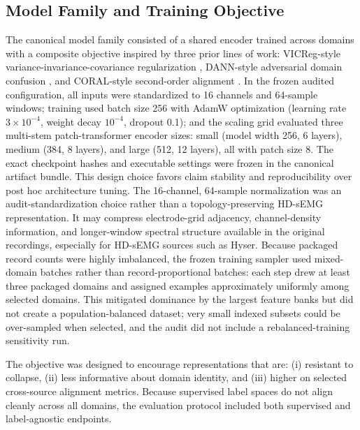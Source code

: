 \documentclass[journal]{IEEEtran}
\begin{document}
\subsection{Model Family and Training Objective}
The canonical model family consisted of a shared encoder trained across domains with a composite objective inspired by three prior lines of work: VICReg-style variance-invariance-covariance regularization \cite{bardes2022vicreg}, DANN-style adversarial domain confusion \cite{ganin2016dann}, and CORAL-style second-order alignment \cite{sun2016deepcoral}. In the frozen audited configuration, all inputs were standardized to 16 channels and 64-sample windows; training used batch size 256 with AdamW optimization (learning rate $3\times10^{-4}$, weight decay $10^{-4}$, dropout 0.1); and the scaling grid evaluated three multi-stem patch-transformer encoder sizes: small (model width 256, 6 layers), medium (384, 8 layers), and large (512, 12 layers), all with patch size 8. The exact checkpoint hashes and executable settings were frozen in the canonical artifact bundle. This design choice favors claim stability and reproducibility over post hoc architecture tuning. The 16-channel, 64-sample normalization was an audit-standardization choice rather than a topology-preserving HD-sEMG representation. It may compress electrode-grid adjacency, channel-density information, and longer-window spectral structure available in the original recordings, especially for HD-sEMG sources such as Hyser. Because packaged record counts were highly imbalanced, the frozen training sampler used mixed-domain batches rather than record-proportional batches: each step drew at least three packaged domains and assigned examples approximately uniformly among selected domains. This mitigated dominance by the largest feature banks but did not create a population-balanced dataset; very small indexed subsets could be over-sampled when selected, and the audit did not include a rebalanced-training sensitivity run.

The objective was designed to encourage representations that are: (i) resistant to collapse, (ii) less informative about domain identity, and (iii) higher on selected cross-source alignment metrics. Because supervised label spaces do not align cleanly across all domains, the evaluation protocol included both supervised and label-agnostic endpoints.
\end{document}
